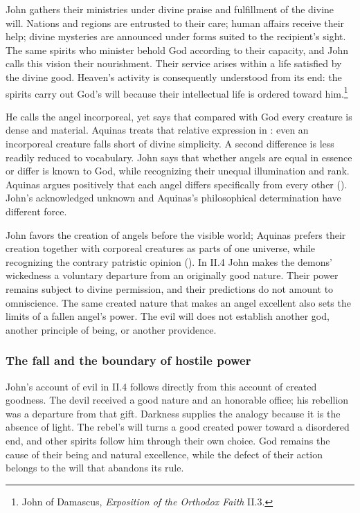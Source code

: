 John gathers their ministries under divine praise and fulfillment of the divine will. Nations and regions are entrusted to their care; human affairs receive their help; divine mysteries are announced under forms suited to the recipient's sight. The same spirits who minister behold God according to their capacity, and John calls this vision their nourishment. Their service arises within a life satisfied by the divine good. Heaven's activity is consequently understood from its end: the spirits carry out God's will because their intellectual life is ordered toward him.\footnote{John of Damascus, \emph{Exposition of the Orthodox Faith} II.3.}

He calls the angel incorporeal, yet says that compared with God every creature is dense and material. Aquinas treats that relative expression in : even an incorporeal creature falls short of divine simplicity. A second difference is less readily reduced to vocabulary. John says that whether angels are equal in essence or differ is known to God, while recognizing their unequal illumination and rank. Aquinas argues positively that each angel differs specifically from every other (). John's acknowledged unknown and Aquinas's philosophical determination have different force.

John favors the creation of angels before the visible world; Aquinas prefers their creation together with corporeal creatures as parts of one universe, while recognizing the contrary patristic opinion (). In II.4 John makes the demons' wickedness a voluntary departure from an originally good nature. Their power remains subject to divine permission, and their predictions do not amount to omniscience. The same created nature that makes an angel excellent also sets the limits of a fallen angel's power. The evil will does not establish another god, another principle of being, or another providence.

\subsubsection{The fall and the boundary of hostile power}

John's account of evil in II.4 follows directly from this account of created goodness. The devil received a good nature and an honorable office; his rebellion was a departure from that gift. Darkness supplies the analogy because it is the absence of light. The rebel's will turns a good created power toward a disordered end, and other spirits follow him through their own choice. God remains the cause of their being and natural excellence, while the defect of their action belongs to the will that abandons its rule.

